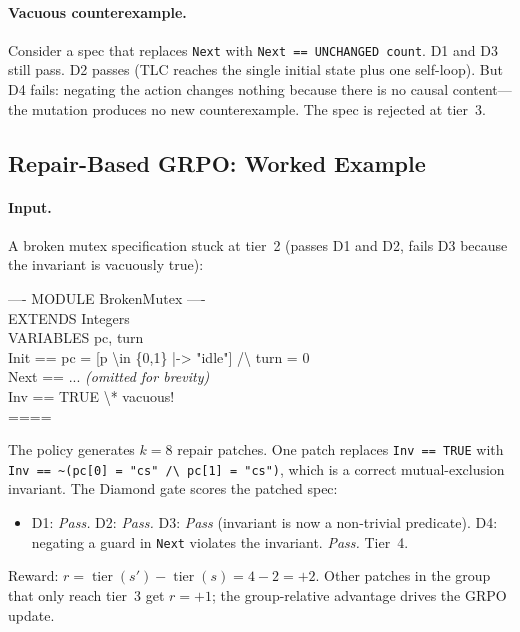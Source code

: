 \documentclass[11pt]{article}
\begin{document}
\paragraph{Vacuous counterexample.} Consider a spec that replaces
\texttt{Next} with \texttt{Next == UNCHANGED count}. D1 and D3 still
pass. D2 passes (TLC reaches the single initial state plus one
self-loop). But D4 fails: negating the action changes nothing because
there is no causal content---the mutation produces no new
counterexample. The spec is rejected at tier~3.

\subsection{Repair-Based GRPO: Worked Example}

\paragraph{Input.} A broken mutex specification stuck at tier~2 (passes
D1 and D2, fails D3 because the invariant is vacuously true):

\begin{tcolorbox}[enhanced, colback=cbox, colframe=cline, boxrule=0.4pt,
  arc=2pt, fontupper=\ttfamily\scriptsize]
---- MODULE BrokenMutex ----\\
EXTENDS Integers\\
VARIABLES pc, turn\\
Init == pc = [p \textbackslash{}in \{0,1\} |-> "idle"] /\textbackslash{} turn = 0\\
Next == ... \textit{(omitted for brevity)}\\
Inv == TRUE \textbackslash{}* vacuous!\\
====
\end{tcolorbox}

\noindent The policy generates $k=8$ repair patches. One patch replaces
\texttt{Inv == TRUE} with
\texttt{Inv == \textasciitilde{}(pc[0] = "cs" /\textbackslash{} pc[1] = "cs")}, which
is a correct mutual-exclusion invariant. The Diamond gate scores the
patched spec:
\begin{itemize}[leftmargin=1.4em, itemsep=1pt]
\item D1: \emph{Pass.} D2: \emph{Pass.} D3: \emph{Pass} (invariant is
  now a non-trivial predicate). D4: negating a guard in \texttt{Next}
  violates the invariant. \emph{Pass.} Tier~4.
\end{itemize}
Reward: $r = \operatorname{tier}(s') - \operatorname{tier}(s) = 4 - 2 = +2$.
Other patches in the group that only reach tier~3 get $r = +1$; the
group-relative advantage drives the GRPO update.
\end{document}
